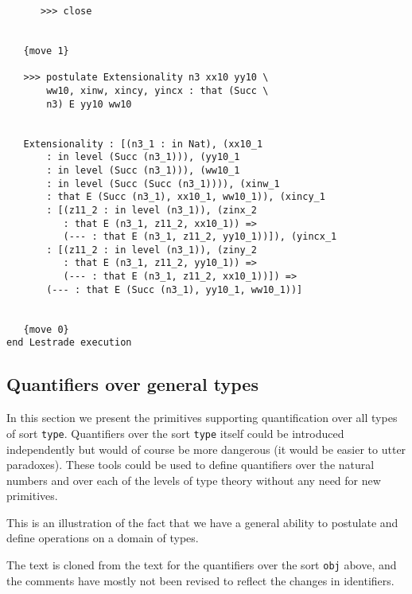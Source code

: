 \documentclass[12pt]{article}
\begin{document}
\begin{verbatim}
      >>> close


   {move 1}

   >>> postulate Extensionality n3 xx10 yy10 \
       ww10, xinw, xincy, yincx : that (Succ \
       n3) E yy10 ww10


   Extensionality : [(n3_1 : in Nat), (xx10_1 
       : in level (Succ (n3_1))), (yy10_1 
       : in level (Succ (n3_1))), (ww10_1 
       : in level (Succ (Succ (n3_1)))), (xinw_1 
       : that E (Succ (n3_1), xx10_1, ww10_1)), (xincy_1 
       : [(z11_2 : in level (n3_1)), (zinx_2 
          : that E (n3_1, z11_2, xx10_1)) => 
          (--- : that E (n3_1, z11_2, yy10_1))]), (yincx_1 
       : [(z11_2 : in level (n3_1)), (ziny_2 
          : that E (n3_1, z11_2, yy10_1)) => 
          (--- : that E (n3_1, z11_2, xx10_1))]) => 
       (--- : that E (Succ (n3_1), yy10_1, ww10_1))]


   {move 0}
end Lestrade execution
\end{verbatim}

\subsection{Quantifiers over general types}

In this section we present the primitives supporting quantification over all types of sort {\tt type}.  Quantifiers over the sort {\tt type} itself could be introduced independently
but would of course be more dangerous (it would be easier to utter paradoxes).  These tools could be used to define quantifiers over the natural numbers and over each of the levels
of type theory without any need for new primitives.

This is an illustration of the fact that we have a general ability to postulate and define operations on a domain of types.

The text is cloned from the text for the quantifiers over the sort {\tt obj} above, and the comments have mostly not been revised to reflect the changes
in identifiers.
\end{document}
